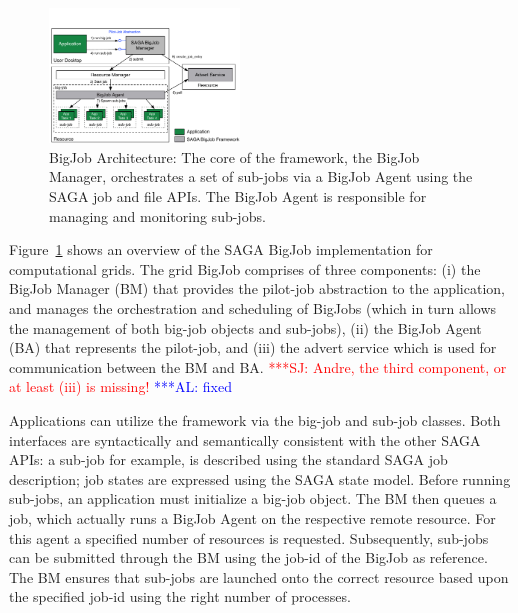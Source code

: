 \documentclass[conference,final]{IEEEtran}
\newcommand{\up}{\vspace*{-1em}}
\newcommand{\alnote}[1]{ {\textcolor{blue} { ***AL: #1 }}}
\newcommand{\jhanote}[1]{ {\textcolor{red} { ***SJ: #1 }}}
\newcommand{\alnote}[1]{}
\newcommand{\jhanote}[1]{}
\begin{document}
\begin{figure}[ht]
    \centering
    \includegraphics[width=0.45\textwidth]{figures/bigjob}
   \caption{BigJob Architecture: The core of the framework, the
      BigJob Manager, orchestrates a set of sub-jobs via a
      BigJob Agent using the SAGA job and file APIs.  The
      BigJob Agent is responsible for managing and monitoring sub-jobs.\up}
   \label{fig:figures_bigjob}   
\end{figure}

Figure~\ref{fig:figures_bigjob} shows an overview of the SAGA BigJob
implementation for computational grids. The grid BigJob comprises of
three components: (i) the BigJob Manager (BM) that provides the
pilot-job abstraction to the application, and manages the
orchestration and scheduling of BigJobs (which in turn allows the
management of both big-job objects and sub-jobs), (ii) the BigJob
Agent (BA) that represents the pilot-job, and (iii) the advert service 
which is used for communication between the BM and BA. 
\jhanote{Andre, the third
  component, or at least (iii) is missing!}\alnote{fixed}

Applications can utilize the framework via the big-job and sub-job
classes. Both interfaces are syntactically and semantically consistent
with the other SAGA APIs: a sub-job for example, is described using
the standard SAGA job description; job states are expressed using the
SAGA state model. Before running sub-jobs, an application must
initialize a big-job object. The BM then queues a job, which actually
runs a BigJob Agent on the respective remote resource. For this agent
a specified number of resources is requested. Subsequently, sub-jobs
can be submitted through the BM using the job-id of the BigJob as
reference. The BM ensures that sub-jobs are launched onto the correct
resource based upon the specified job-id using the right number of
processes.

\end{document}
